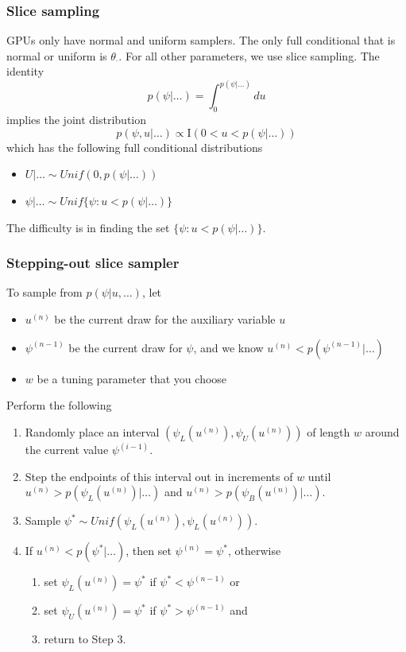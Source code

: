 \documentclass[handout]{beamer}\usepackage[]{graphicx}\usepackage[]{color}
\begin{document}
\begin{frame}
\frametitle{Slice sampling}

GPUs only have normal and uniform samplers. 
\pause 
The only full conditional that is normal or uniform is $\theta_\cdot$. 
\pause 
For all other parameters, we use slice sampling.  
\pause
The identity
\[
p(\psi|\ldots) = \int_0^{p(\psi|\ldots)} du
\]
\pause
implies the joint distribution
\[ 
p(\psi,u|\ldots) \propto \mathrm{I}(0<u<p(\psi|\ldots))
\]
\pause
which has the following full conditional distributions
\begin{itemize}
\item $U|\ldots \sim Unif(0,p(\psi|\ldots))$ \pause
\item $\psi|\ldots \sim Unif\{\psi:u<p(\psi|\ldots)\}$
\end{itemize}
\pause
The difficulty is in finding the set $\{\psi:u<p(\psi|\ldots)\}$.
\end{frame}



\begin{frame}
\frametitle{Stepping-out slice sampler}

To sample from $p(\psi|u,\ldots)$, let 
\begin{itemize}
\item $u^{(n)}$ be the current draw for the auxiliary variable $u$ \pause
\item $\psi^{(n-1)}$ be the current draw for $\psi$, \pause and we know $u^{(n)}<p(\psi^{(n-1)}|\ldots)$ \pause
\item $w$ be a tuning parameter that you choose
\end{itemize}
\pause
Perform the following
\begin{enumerate}
\item Randomly place an interval $(\psi_L(u^{(n)}),\psi_U(u^{(n)}))$ of length $w$ around the current value $\psi^{(i-1)}$. \pause
\item Step the endpoints of this interval out in increments of $w$ until $u^{(n)}>p(\psi_L(u^{(n)})|\ldots)$ and $u^{(n)}>p(\psi_B(u^{(n)})|\ldots)$. \pause
\item Sample $\psi^* \sim Unif(\psi_L(u^{(n)}),\psi_L(u^{(n)}))$. \pause
\item If $u^{(n)}<p(\psi^*|\ldots)$, then set $\psi^{(n)} = \psi^*$, \pause otherwise
  \begin{enumerate}
  \item set $\psi_L(u^{(n)}) = \psi^*$ if $\psi^* <  \psi^{(n-1)}$ or
  \item set $\psi_U(u^{(n)}) = \psi^*$ if $\psi^* > \psi^{(n-1)}$ \pause and
  \item return to Step 3.
  \end{enumerate}
\end{enumerate}
\end{frame}
\end{document}
